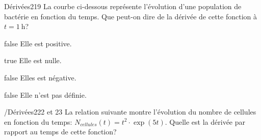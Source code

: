 \documentclass[11pt]{article}
\begin{document}
            \begin{question}{20}{Dérivées}{2}{19}
            La courbe ci-dessous représente l'évolution d'une population de bactérie en fonction du temps. Que peut-on dire de la dérivée de cette fonction à $t=\SI{1}{\hour}$?
            \begin{figure}[!h]
	          \begin{center}
              \end{center}
              \end{figure}
        \end{question}
        
        \begin{reponses}
            	\item[false]  Elle est positive.
            	\item[true]  Elle est nulle.
                \item[false]  Elles est négative.
                \item[false]   Elle n'est pas définie.
            \end{reponses}

      
			
			 \begin{question}{/}{Dérivées}{2}{22 et 23}
				La relation suivante montre l'évolution du nombre de cellules en fonction du temps: $N_{cellules}(t)=t^{2}\cdot\exp(5t)$. Quelle est la dérivée par rapport au temps de cette fonction?

            \end{question}
\end{document}
